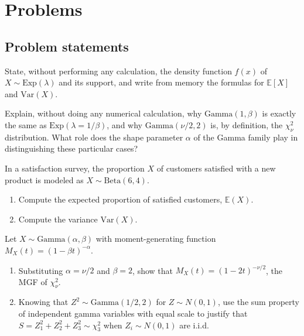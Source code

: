 \section*{Problems}

\subsection*{Problem statements}

\begin{problema}
	\label{prob:f00c4b6}
	State, without performing any calculation, the density function $f(x)$ of $X \sim \text{Exp}(\lambda)$ and its support, and write from memory the formulas for $\mathbb{E}[X]$ and $\text{Var}(X)$.
\end{problema}

\begin{problema}
	\label{prob:de365e8}
	Explain, without doing any numerical calculation, why $\text{Gamma}(1,\beta)$ is exactly the same as $\text{Exp}(\lambda=1/\beta)$, and why $\text{Gamma}(\nu/2, 2)$ is, by definition, the $\chi^2_\nu$ distribution. What role does the shape parameter $\alpha$ of the Gamma family play in distinguishing these particular cases?
\end{problema}

\begin{problema}
	\label{prob:491786c}
	In a satisfaction survey, the proportion $X$ of customers satisfied with a new product is modeled as $X \sim \text{Beta}(6,4)$.
	\begin{enumerate}
		\item Compute the expected proportion of satisfied customers, $\mathbb{E}(X)$.
		\item Compute the variance $\text{Var}(X)$.
	\end{enumerate}
\end{problema}

\begin{problema}
	\label{prob:6b498ea}
	Let $X \sim \text{Gamma}(\alpha,\beta)$ with moment-generating function $M_X(t) = (1-\beta t)^{-\alpha}$.
	\begin{enumerate}
		\item Substituting $\alpha=\nu/2$ and $\beta=2$, show that $M_X(t) = (1-2t)^{-\nu/2}$, the MGF of $\chi^2_\nu$.
		\item Knowing that $Z^2 \sim \text{Gamma}(1/2,2)$ for $Z\sim N(0,1)$, use the sum property of independent gamma variables with equal scale to justify that $S=Z_1^2+Z_2^2+Z_3^2 \sim \chi^2_3$ when $Z_i \sim N(0,1)$ are i.i.d.
	\end{enumerate}
\end{problema}

